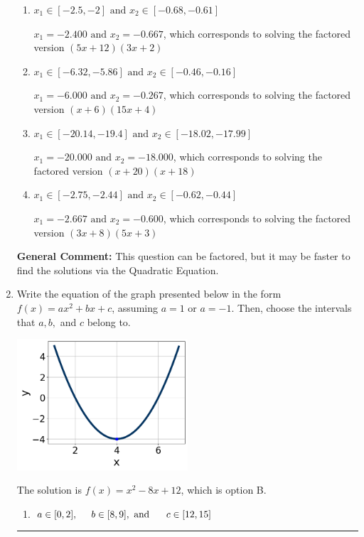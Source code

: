 \documentclass{extbook}[14pt]
\newcommand{\litem}[1]{\item #1

\rule{\textwidth}{0.4pt}}
\begin{document}
\begin{enumerate}
{\begin{enumerate}[label=\Alph*.]
* $x_1 = -1.333 \text{ and } x_2 = -1.200$, which is the correct option. Obtained by solving the factored version $(3x + 4)(5x + 6)$
\item \( x_1 \in [-2.5, -2] \text{ and } x_2 \in [-0.68, -0.61] \)

$x_1 = -2.400 \text{ and } x_2 = -0.667$, which corresponds to solving the factored version $(5x + 12)(3x + 2)$
\item \( x_1 \in [-6.32, -5.86] \text{ and } x_2 \in [-0.46, -0.16] \)

$x_1 = -6.000 \text{ and } x_2 = -0.267$, which corresponds to solving the factored version $(x + 6)(15x + 4)$
\item \( x_1 \in [-20.14, -19.4] \text{ and } x_2 \in [-18.02, -17.99] \)

$x_1 = -20.000 \text{ and } x_2 = -18.000$, which corresponds to solving the factored version $(x + 20)(x + 18)$
\item \( x_1 \in [-2.75, -2.44] \text{ and } x_2 \in [-0.62, -0.44] \)

$x_1 = -2.667 \text{ and } x_2 = -0.600$, which corresponds to solving the factored version $(3x + 8)(5x + 3)$
\end{enumerate}

\textbf{General Comment:} This question can be factored, but it may be faster to find the solutions via the Quadratic Equation.
}
\litem{
Write the equation of the graph presented below in the form $f(x)=ax^2+bx+c$, assuming  $a=1$ or $a=-1$. Then, choose the intervals that $a, b,$ and $c$ belong to.

\begin{center}
    \includegraphics[width=0.5\textwidth]{../Figures/quadraticGraphToEquationCopyB.png}
\end{center}


The solution is \( f(x) = x^{2} -8 x + 12 \), which is option B.\begin{enumerate}[label=\Alph*.]
\item \( a \in [0, 2], \hspace*{5mm} b \in [8, 9], \text{ and } \hspace*{5mm} c \in [12, 15] \)


\end{enumerate}}
\end{enumerate}
\end{document}
